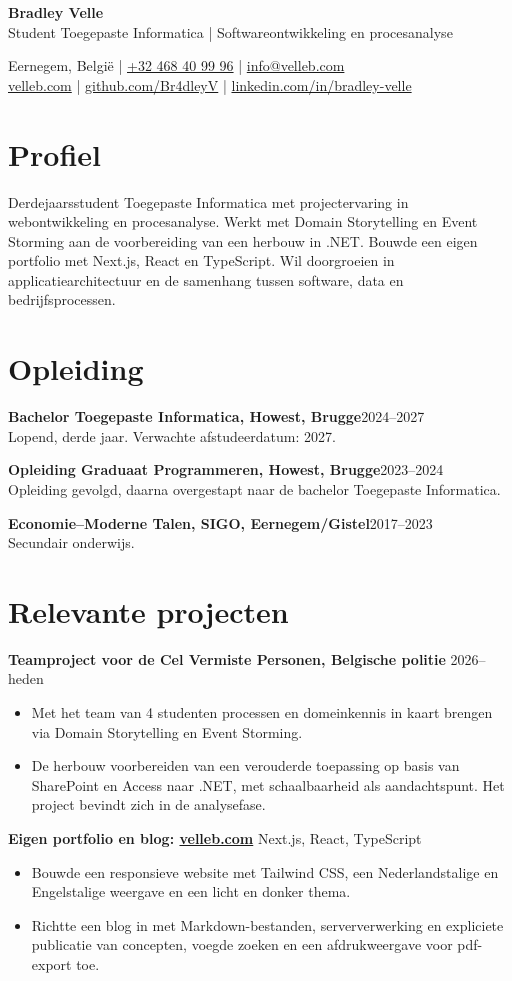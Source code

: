 \documentclass[a4paper,10pt]{article}
\newcommand{\entry}[3]{\textbf{#1}\hfill #2\\#3\par}
\begin{document}
{\LARGE\bfseries\color{accent} Bradley Velle}\\[3pt]
{\large Student Toegepaste Informatica | Softwareontwikkeling en procesanalyse}

Eernegem, België \enspace | \enspace \href{tel:+32468409996}{+32 468 40 99 96} \enspace | \enspace \href{mailto:info@velleb.com}{info@velleb.com}\\
\href{https://velleb.com}{velleb.com} \enspace | \enspace \href{https://github.com/Br4dleyV}{github.com/Br4dleyV} \enspace | \enspace \href{https://linkedin.com/in/bradley-velle}{linkedin.com/in/bradley-velle}

\section{Profiel}
Derdejaarsstudent Toegepaste Informatica met projectervaring in webontwikkeling en procesanalyse. Werkt met Domain Storytelling en Event Storming aan de voorbereiding van een herbouw in .NET. Bouwde een eigen portfolio met Next.js, React en TypeScript. Wil doorgroeien in applicatiearchitectuur en de samenhang tussen software, data en bedrijfsprocessen.

\section{Opleiding}
\entry{Bachelor Toegepaste Informatica, Howest, Brugge}{2024--2027}{Lopend, derde jaar. Verwachte afstudeerdatum: 2027.}
\entry{Opleiding Graduaat Programmeren, Howest, Brugge}{2023--2024}{Opleiding gevolgd, daarna overgestapt naar de bachelor Toegepaste Informatica.}
\entry{Economie--Moderne Talen, SIGO, Eernegem/Gistel}{2017--2023}{Secundair onderwijs.}

\section{Relevante projecten}
\textbf{Teamproject voor de Cel Vermiste Personen, Belgische politie} \hfill 2026--heden
\begin{itemize}
\item Met het team van 4 studenten processen en domeinkennis in kaart brengen via Domain Storytelling en Event Storming.
\item De herbouw voorbereiden van een verouderde toepassing op basis van SharePoint en Access naar .NET, met schaalbaarheid als aandachtspunt. Het project bevindt zich in de analysefase.
\end{itemize}
\textbf{Eigen portfolio en blog: \href{https://velleb.com}{velleb.com}} \hfill Next.js, React, TypeScript
\begin{itemize}
\item Bouwde een responsieve website met Tailwind CSS, een Nederlandstalige en Engelstalige weergave en een licht en donker thema.
\item Richtte een blog in met Markdown-bestanden, serververwerking en expliciete publicatie van concepten, voegde zoeken en een afdrukweergave voor pdf-export toe.
\end{itemize}
\end{document}
